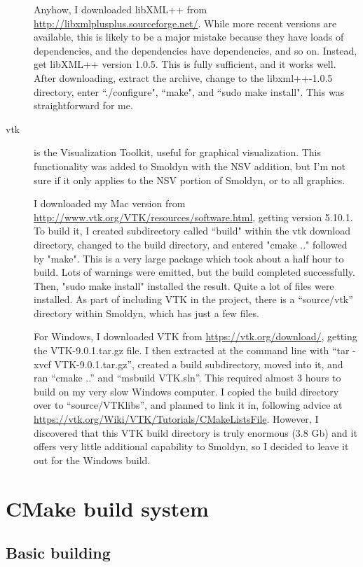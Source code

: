 \documentclass {scrbook}
\begin{document}
\begin{description}
Anyhow, I downloaded libXML++ from \url{http://libxmlplusplus.sourceforge.net/}. While more recent versions are available, this is likely to be a major mistake because they have loads of dependencies, and the dependencies have dependencies, and so on. Instead, get libXML++ version 1.0.5. This is fully sufficient, and it works well. After downloading, extract the archive, change to the libxml++-1.0.5 directory, enter ``./configure", ``make", and ``sudo make install". This was straightforward for me.

\item[vtk] is the Visualization Toolkit, useful for graphical visualization. This functionality was added to Smoldyn with the NSV addition, but I'm not sure if it only applies to the NSV portion of Smoldyn, or to all graphics.

I downloaded my Mac version from \url{http://www.vtk.org/VTK/resources/software.html}, getting version 5.10.1. To build it, I created subdirectory called ``build" within the vtk download directory, changed to the build directory, and entered "cmake .." followed by "make". This is a very large package which took about a half hour to build. Lots of warnings were emitted, but the build completed successfully. Then, "sudo make install" installed the result. Quite a lot of files were installed. As part of including VTK in the project, there is a ``source/vtk'' directory within Smoldyn, which has just a few files.

For Windows, I downloaded VTK from \url{https://vtk.org/download/}, getting the VTK-9.0.1.tar.gz file. I then extracted at the command line with ``tar -xvcf VTK-9.0.1.tar.gz'', created a build subdirectory, moved into it, and ran ``cmake ..'' and ``msbuild VTK.sln''. This required almost 3 hours to build on my very slow Windows computer. I copied the build directory over to ``source/VTKlibs'', and planned to link it in, following advice at \url{https://vtk.org/Wiki/VTK/Tutorials/CMakeListsFile}. However, I discovered that this VTK build directory is truly enormous (3.8 Gb) and it offers very little additional capability to Smoldyn, so I decided to leave it out for the Windows build.

\end{description}


\section{CMake build system}

\subsection{Basic building}
\end{document}
